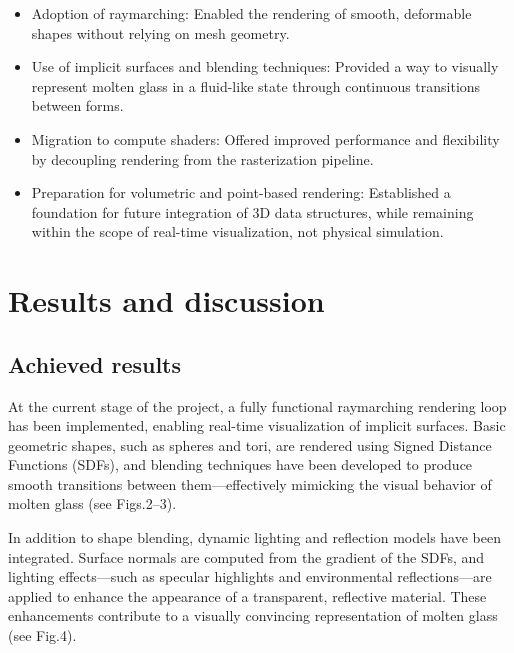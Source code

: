 \documentclass{rapportcs}
\begin{document}
        \begin{itemize}
            \item Adoption of raymarching: Enabled the rendering of smooth, deformable shapes without relying on mesh geometry.\\
            
            \item Use of implicit surfaces and blending techniques: Provided a way to visually represent molten glass in a fluid-like state through continuous transitions between forms.\\
            
            \item Migration to compute shaders: Offered improved performance and flexibility by decoupling rendering from the rasterization pipeline.\\
            
            \item Preparation for volumetric and point-based rendering: Established a foundation for future integration of 3D data structures, while remaining within the scope of real-time visualization, not physical simulation.\\
            
        \end{itemize}
    
\newpage

\section{Results and discussion}

    \subsection{Achieved results}
    
        At the current stage of the project, a fully functional raymarching rendering loop has been implemented, enabling real-time visualization of implicit surfaces. Basic geometric shapes, such as spheres and tori, are rendered using Signed Distance Functions (SDFs), and blending techniques have been developed to produce smooth transitions between them—effectively mimicking the visual behavior of molten glass (see Figs.2–3).

        In addition to shape blending, dynamic lighting and reflection models have been integrated. Surface normals are computed from the gradient of the SDFs, and lighting effects—such as specular highlights and environmental reflections—are applied to enhance the appearance of a transparent, reflective material. These enhancements contribute to a visually convincing representation of molten glass (see Fig.4).
        
\end{document}
